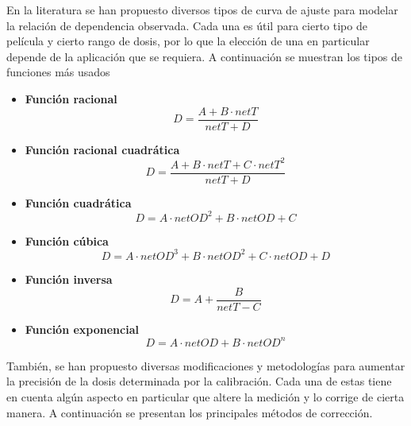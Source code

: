 En la literatura se han propuesto diversos tipos de curva de ajuste para modelar la relación de dependencia observada. Cada una es útil para cierto tipo de película y cierto rango de dosis, por lo que la elección de una en particular depende de la aplicación que se requiera. A continuación se muestran los tipos de funciones más usados\cite{Devic2016} \\

\begin{itemize}
\item\textbf{Función racional}\\
\begin{equation}
	D=\frac{A+B\cdot netT}{netT+D}
\end{equation}
\item\textbf{Función racional cuadrática}\\
\begin{equation}
D=\frac{A+B\cdot netT+C\cdot netT^2}{netT+D}
\end{equation}
\item\textbf{Función cuadrática}\\
\begin{equation}
D=A\cdot netOD^2+B\cdot netOD+C
\end{equation}
\item\textbf{Función cúbica}\\
\begin{equation}
D=A\cdot netOD^3+B\cdot netOD^2+C\cdot netOD +D 
\end{equation}

\item\textbf{Función inversa}\\
\begin{equation}
D=A+\frac{B}{netT-C}
\end{equation}

\item\textbf{Función exponencial}\\
\begin{equation}
D=A\cdot netOD+B\cdot netOD^n
\end{equation}
\end{itemize}

También, se han propuesto diversas modificaciones y metodologías para aumentar la precisión de la dosis determinada por la calibración. Cada una de estas tiene en cuenta algún aspecto en particular que altere la medición y lo corrige de cierta manera. A continuación se presentan los principales métodos de corrección.\\


